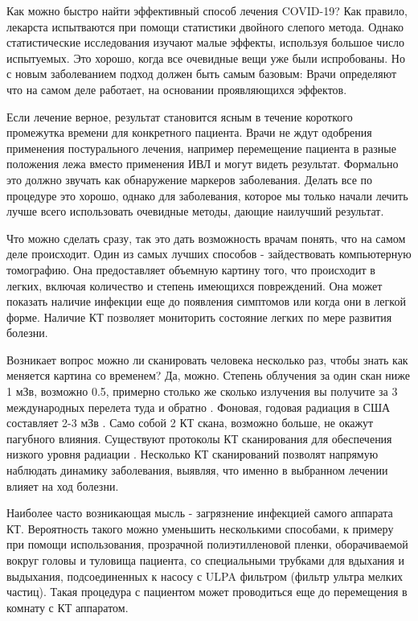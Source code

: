 \documentclass[onecolumn,journal]{IEEEtran}
\begin{document}
\begin{multicols}{2}

Как можно быстро найти эффективный способ лечения COVID-19? Как правило, лекарста испытваются при помощи статистики двойного слепого метода. Однако статистические исследования изучают малые эффекты, используя большое число испытуемых. Это хорошо, когда все очевидные вещи уже были испробованы. Но с новым заболеванием подход должен быть самым базовым: Врачи определяют что на самом деле работает, на основании проявляющихся эффектов.

Если лечение верное, результат становится ясным в течение короткого промежутка времени для конкретного пациента. Врачи не ждут одобрения применения постурального лечения, например перемещение пациента в разные положения лежа вместо применения ИВЛ и могут видеть результат. Формально это должно звучать как обнаружение маркеров заболевания. Делать все по процедуре это хорошо, однако для заболевания, которое мы только начали лечить лучше всего использовать очевидные методы, дающие наилучший результат.

Что можно сделать сразу, так это дать возможность врачам понять, что на самом деле происходит. Один из самых лучших способов - зайдествовать компьютерную томографию. Она предоставляет объемную картину того, что происходит в легких, включая количество и степень имеющихся повреждений. Она может показать наличие инфекции еще до появления симптомов или когда они в легкой форме. Наличие КТ позволяет мониторить состояние легких по мере развития болезни.

Возникает вопрос можно ли сканировать человека несколько раз, чтобы знать как меняется картина со временем? Да, можно. Степень облучения за один скан ниже 1 мЗв, возможно 0.5, примерно столько же сколько излучения вы получите за 3 международных перелета туда и обратно \cite{r1}. Фоновая, годовая радиация в США составляет 2-3 мЗв \cite{r2}. Само собой 2 КТ скана, возможно больше, не окажут пагубного влияния. Существуют протоколы КТ сканирования для обеспечения низкого уровня радиации \cite{cancer}. Несколько КТ сканирований позволят напрямую наблюдать динамику заболевания, выявляя, что именно в выбранном лечении влияет на ход болезни.

Наиболее часто возникающая мысль - загрязнение инфекцией самого аппарата КТ. Вероятность такого можно уменьшить несколькими способами, к примеру при помощи использования, прозрачной полиэтилленовой пленки, оборачиваемой вокруг головы и туловища пациента, со специальными трубками для вдыхания и выдыхания, подсоединенных к насосу с ULPA фильтром (фильтр ультра мелких частиц). Такая процедура с пациентом может проводиться еще до перемещения в комнату с КТ аппаратом.


\end{multicols}
\end{document}
